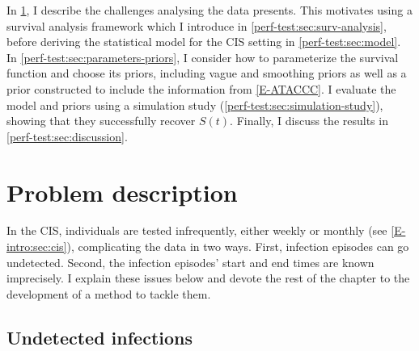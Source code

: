 \documentclass[thesis.tex]{subfiles}
\begin{document}
In \cref{perf-test:sec:problem}, I describe the challenges analysing the data presents.
This motivates using a survival analysis framework which I introduce in \cref{perf-test:sec:surv-analysis}, before deriving the statistical model for the CIS setting in \cref{perf-test:sec:model}.
In \cref{perf-test:sec:parameters-priors}, I consider how to parameterize the survival function and choose its priors, including vague and smoothing priors as well as a prior constructed to include the information from \cref{E-ATACCC}.
I evaluate the model and priors using a simulation study (\cref{perf-test:sec:simulation-study}), showing that they successfully recover $S(t)$.
Finally, I discuss the results in \cref{perf-test:sec:discussion}.

\section{Problem description} \label{perf-test:sec:problem}

In the CIS, individuals are tested infrequently, either weekly or monthly (see \cref{E-intro:sec:cis}), complicating the data in two ways.
First, infection episodes can go undetected.
Second, the infection episodes' start and end times are known imprecisely.
I explain these issues below and devote the rest of the chapter to the development of a method to tackle  them.

\subsection{Undetected infections} \label{perf-test:sec:undetected}
\end{document}
